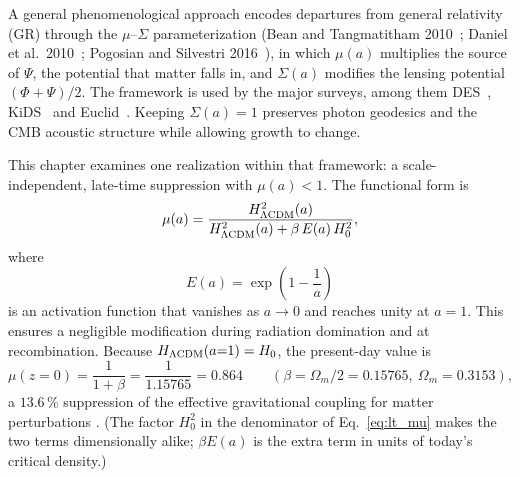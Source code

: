 A general phenomenological approach encodes departures from general relativity (GR) through the $\mu$--$\Sigma$ parameterization (Bean and
Tangmatitham 2010~\cite{BeanTangmatitham2010}; Daniel et al.\ 2010~\cite{Daniel2010}; Pogosian and Silvestri 2016~\cite{PogosianSilvestri2016}), in
which $\mu(a)$ multiplies the source of $\Psi$, the potential that matter falls in, and $\Sigma(a)$ modifies the lensing potential $(\Phi+\Psi)/2$. The framework is
used by the major surveys, among them DES~\cite{DESY3Ext}, KiDS~\cite{Heymans2021} and Euclid~\cite{Frusciante2025}. Keeping $\Sigma(a)=1$
preserves photon geodesics and the CMB acoustic structure while allowing growth to change.

This chapter examines one realization within that framework: a scale-independent, late-time suppression with $\mu(a)<1$. The functional form is
\begin{equation}
\mu(a)=\frac{H^2_{\Lambda\rm CDM}(a)}{H^2_{\Lambda\rm CDM}(a)+\beta\,E(a)\,H_0^2},
\label{eq:lt_mu}\end{equation}
where
\begin{equation}
E(a)=\exp\!\left(1-\frac1a\right)
\label{eq:lt_activation}\end{equation}
is an activation function that vanishes as $a\to0$ and reaches unity at $a=1$. This ensures a negligible modification during radiation domination
and at recombination. Because $H_{\Lambda\rm CDM}(a{=}1)=H_0$, the present-day value is
\begin{equation}
\mu(z{=}0)=\frac{1}{1+\beta}=\frac{1}{1.15765}=0.864\qquad(\beta=\Omega_m/2=0.15765,\ \Omega_m=0.3153),
\label{eq:lt_mu0}\end{equation}
a $13.6\,\%$ suppression of the effective gravitational coupling for matter perturbations \calc. (The factor $H_0^2$ in the denominator of
Eq.~\eqref{eq:lt_mu} makes the two terms dimensionally alike; $\beta E(a)$ is the extra term in units of today's critical density.)

